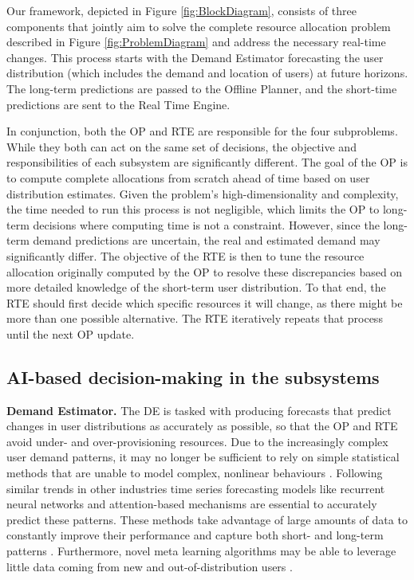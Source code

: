 \documentclass[letterpaper]{article} %
\begin{document}
Our framework, depicted in Figure \ref{fig:BlockDiagram}, consists of three components that jointly aim to solve the complete resource allocation problem described in Figure \ref{fig:ProblemDiagram} and address the necessary real-time changes. This process starts with the Demand Estimator forecasting the user distribution (which includes the demand and location of users) at future horizons. The long-term predictions are passed to the Offline Planner, and the short-time predictions are sent to the Real Time Engine.


In conjunction, both the OP and RTE are responsible for the four subproblems. While they both can act on the same set of decisions, the objective and responsibilities of each subsystem are significantly different. The goal of the OP is to compute complete allocations from scratch ahead of time based on user distribution estimates. Given the problem's high-dimensionality and complexity, the time needed to run this process is not negligible, which limits the OP to long-term decisions where computing time is not a constraint. However, since the long-term demand predictions are uncertain, the real and estimated demand may significantly differ. The objective of the RTE is then to tune the resource allocation originally computed by the OP to resolve these discrepancies based on more detailed knowledge of the short-term user distribution. To that end, the RTE should first decide which specific resources it will change, as there might be more than one possible alternative. The RTE iteratively repeats that process until the next OP update. 


\subsection{AI-based decision-making in the subsystems}

\textbf{Demand Estimator.} The DE is tasked with producing forecasts that predict changes in user distributions as accurately as possible, so that the OP and RTE avoid under- and over-provisioning resources. Due to the increasingly complex user demand patterns, it may no longer be sufficient to rely on simple statistical methods that are unable to model complex, nonlinear behaviours \cite{Suganthi2012}. Following similar trends in other industries \cite{Fildes2002, Zhao2012, Wang2017, Panapakidis2016, Sagheer2019} time series forecasting models like recurrent neural networks and attention-based mechanisms \cite{Vaswani2017} are essential to accurately predict these patterns. These methods take advantage of large amounts of data to constantly improve their performance and capture both short- and long-term patterns \cite{Vaswani2017}. Furthermore, novel meta learning algorithms may be able to leverage little data coming from new and out-of-distribution users \cite{Panigrahi2021}.
\end{document}
